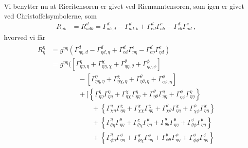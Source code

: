 \documentclass[../main.tex]{subfiles}
\begin{document}
Vi benytter nu at Riccitensoren er givet ved Riemanntensoren, som igen er givet ved Christoffelsymbolerne, som
\begin{align}
    R_{ab} &= R^d_{adb}
        = \Gamma^d_{ab,d} - \Gamma^d_{ad,b} + \Gamma^d_{ed} \Gamma^e_{ab} - \Gamma^d_{eb} \Gamma^e_{ad} \: ,
\end{align}
hvorved vi får\\
\begin{subequations}
\begin{align}
    \begin{split}
        R^\eta_\eta %
        &= g^{\eta \eta} \left(\Gamma^d_{\eta\eta,d} - \Gamma^d_{\eta d,\eta} + \Gamma^d_{ed} \Gamma^e_{\eta\eta} - \Gamma^d_{e\eta} \Gamma^e_{\eta d} \right) \\
        &= g^{\eta \eta} \bigg(
            \left[ \Gamma^\eta_{\eta\eta,\eta} + \Gamma^\chi_{\eta\eta,\chi} + \Gamma^\theta_{\eta\eta,\theta} + \Gamma^\phi_{\eta\eta,\phi} \right] \\
            &\qquad\qquad - \left[ \Gamma^\eta_{\eta \eta,\eta} + \Gamma^\chi_{\eta \chi,\eta} + \Gamma^\theta_{\eta \theta,\eta} + \Gamma^\phi_{\eta \phi,\eta} \right] \\
            &\qquad\qquad + \Big[ \left\{ \Gamma^\eta_{\eta\eta} \Gamma^\eta_{\eta\eta} + \Gamma^\chi_{\eta\chi} \Gamma^\eta_{\eta\eta} + \Gamma^\theta_{\eta\theta} \Gamma^\eta_{\eta\eta} + \Gamma^\phi_{\eta\phi} \Gamma^\eta_{\eta\eta} \right\} \\
                &\qquad\qquad\qquad + \left\{ \Gamma^\eta_{\chi\eta} \Gamma^\chi_{\eta\eta} + \Gamma^\chi_{\chi\chi} \Gamma^\chi_{\eta\eta} + \Gamma^\theta_{\chi\theta} \Gamma^\chi_{\eta\eta} + \Gamma^\phi_{\chi\phi} \Gamma^\chi_{\eta\eta} \right\} \\
                &\qquad\qquad\qquad + \left\{ \Gamma^\eta_{\theta\eta} \Gamma^\theta_{\eta\eta} + \Gamma^\chi_{\theta\chi} \Gamma^\theta_{\eta\eta} + \Gamma^\theta_{\theta\theta} \Gamma^\theta_{\eta\eta} + \Gamma^\phi_{\theta\phi} \Gamma^\theta_{\eta\eta} \right\} \\
                &\qquad\qquad\qquad + \left\{ \Gamma^\eta_{\phi\eta} \Gamma^\phi_{\eta\eta} + \Gamma^\chi_{\phi\chi} \Gamma^\phi_{\eta\eta} + \Gamma^\theta_{\phi\theta} \Gamma^\phi_{\eta\eta} + \Gamma^\phi_{\phi\phi} \Gamma^\phi_{\eta\eta} \right\}

\end{split}
\end{align}
\end{subequations}
\end{document}
